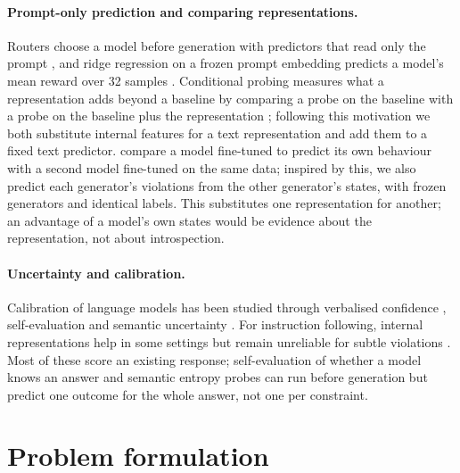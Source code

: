 \documentclass{article}
\begin{document}
\paragraph{Prompt-only prediction and comparing representations.} Routers choose a model before generation with
predictors that read only the prompt \citep{ding2024hybrid,ong2025routellm}, and ridge regression on a frozen prompt
embedding predicts a model's mean reward over 32 samples \citep{hasanaliyev2026expected}. Conditional probing
measures what a representation adds beyond a baseline by comparing a probe on the baseline with a probe on the baseline
plus the representation \citep{hewitt2021conditional}; following this motivation we both substitute internal features
for a text representation and add them to a fixed text predictor. \citet{binder2025looking} compare a model
fine-tuned to predict its own behaviour with a second model fine-tuned on the same data; inspired by this, we also
predict each generator's violations from the other generator's states, with frozen generators and identical labels.
This substitutes one representation for another; an advantage of a model's own states would be evidence about the
representation, not about introspection.

\paragraph{Uncertainty and calibration.} Calibration \citep{guo2017calibration} of language models has been studied
through verbalised confidence \citep{lin2022teaching,tian2023just,xiong2024express}, self-evaluation
\citep{kadavath2022know} and semantic uncertainty \citep{kuhn2023semantic,farquhar2024detecting,kossen2024sep}. For
instruction following, internal representations help in some settings but remain unreliable for subtle violations
\citep{heo2025uncertainty}. Most of these score an existing response; self-evaluation of whether a model knows an answer and semantic entropy
probes can run before generation but predict one outcome for the whole answer, not one per constraint.

\section{Problem formulation}
\label{sec:problem}
\end{document}
